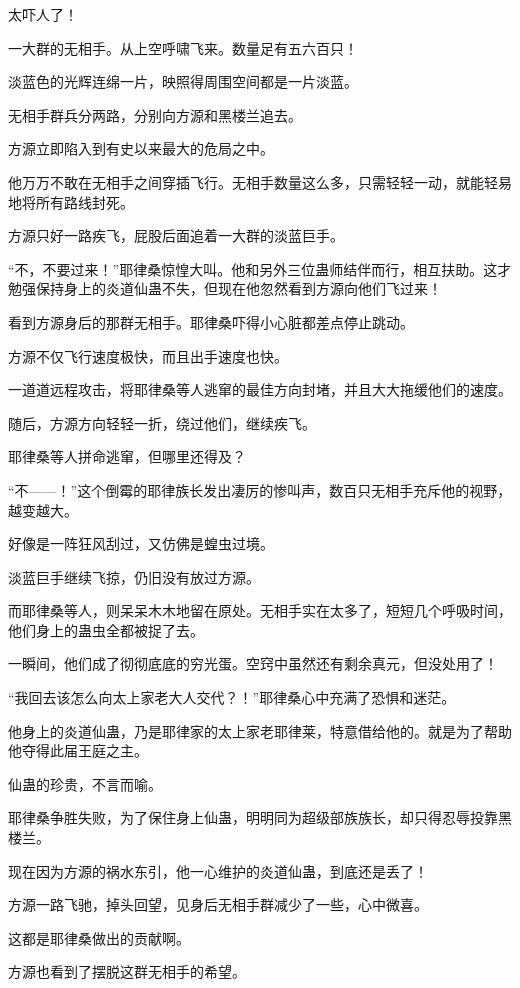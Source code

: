 \begin{this_body}
太吓人了！

一大群的无相手。从上空呼啸飞来。数量足有五六百只！

淡蓝色的光辉连绵一片，映照得周围空间都是一片淡蓝。

无相手群兵分两路，分别向方源和黑楼兰追去。

方源立即陷入到有史以来最大的危局之中。

他万万不敢在无相手之间穿插飞行。无相手数量这么多，只需轻轻一动，就能轻易地将所有路线封死。

方源只好一路疾飞，屁股后面追着一大群的淡蓝巨手。

“不，不要过来！”耶律桑惊惶大叫。他和另外三位蛊师结伴而行，相互扶助。这才勉强保持身上的炎道仙蛊不失，但现在他忽然看到方源向他们飞过来！

看到方源身后的那群无相手。耶律桑吓得小心脏都差点停止跳动。

方源不仅飞行速度极快，而且出手速度也快。

一道道远程攻击，将耶律桑等人逃窜的最佳方向封堵，并且大大拖缓他们的速度。

随后，方源方向轻轻一折，绕过他们，继续疾飞。

耶律桑等人拼命逃窜，但哪里还得及？

“不——！”这个倒霉的耶律族长发出凄厉的惨叫声，数百只无相手充斥他的视野，越变越大。

好像是一阵狂风刮过，又仿佛是蝗虫过境。

淡蓝巨手继续飞掠，仍旧没有放过方源。

而耶律桑等人，则呆呆木木地留在原处。无相手实在太多了，短短几个呼吸时间，他们身上的蛊虫全都被捉了去。

一瞬间，他们成了彻彻底底的穷光蛋。空窍中虽然还有剩余真元，但没处用了！

“我回去该怎么向太上家老大人交代？！”耶律桑心中充满了恐惧和迷茫。

他身上的炎道仙蛊，乃是耶律家的太上家老耶律莱，特意借给他的。就是为了帮助他夺得此届王庭之主。

仙蛊的珍贵，不言而喻。

耶律桑争胜失败，为了保住身上仙蛊，明明同为超级部族族长，却只得忍辱投靠黑楼兰。

现在因为方源的祸水东引，他一心维护的炎道仙蛊，到底还是丢了！

方源一路飞驰，掉头回望，见身后无相手群减少了一些，心中微喜。

这都是耶律桑做出的贡献啊。

方源也看到了摆脱这群无相手的希望。


\end{this_body}
